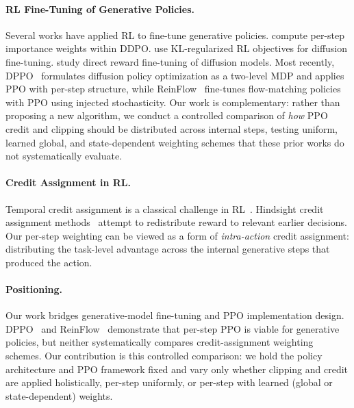\paragraph{RL Fine-Tuning of Generative Policies.}
Several works have applied RL to fine-tune generative policies.
\citet{black2024ddpo} compute per-step importance weights within DDPO.
\citet{fan2024dpok} use KL-regularized RL objectives for diffusion fine-tuning.
\citet{clark2024directly} study direct reward fine-tuning of diffusion models.
Most recently, DPPO~\citep{ren2025dppo} formulates diffusion policy optimization
as a two-level MDP and applies PPO with per-step structure, while
ReinFlow~\citep{hu2025reinflow} fine-tunes flow-matching policies with PPO using
injected stochasticity.  Our work is complementary: rather than proposing a new
algorithm, we conduct a controlled comparison of \emph{how} PPO credit and
clipping should be distributed across internal steps, testing uniform, learned
global, and state-dependent weighting schemes that these prior works do not
systematically evaluate.

\paragraph{Credit Assignment in RL.}
Temporal credit assignment is a classical challenge in
RL~\citep{sutton2018rl,minsky1961steps}.  Hindsight credit assignment
methods~\citep{harutyunyan2019hindsight,hung2019optimizing} attempt to
redistribute reward to relevant earlier decisions.  Our per-step weighting can
be viewed as a form of \emph{intra-action} credit assignment: distributing the
task-level advantage across the internal generative steps that produced the
action.

\paragraph{Positioning.}
Our work bridges generative-model fine-tuning and PPO implementation design.
DPPO~\citep{ren2025dppo} and ReinFlow~\citep{hu2025reinflow} demonstrate that
per-step PPO is viable for generative policies, but neither systematically
compares credit-assignment weighting schemes.  Our contribution is this
controlled comparison: we hold the policy architecture and PPO framework fixed
and vary only whether clipping and credit are applied holistically, per-step
uniformly, or per-step with learned (global or state-dependent) weights.
